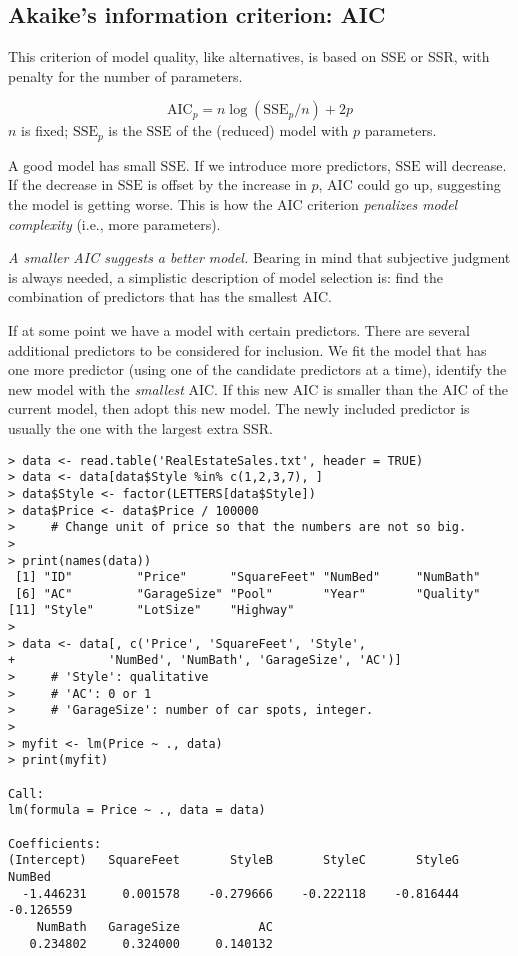 \documentclass[12pt]{article}
\newcommand\SSE{\text{SSE}}
\begin{document}
\subsection*{Akaike's information criterion: AIC}

This criterion of model quality, like alternatives,
is based on SSE or SSR, with penalty for the number of
parameters.

\[
\text{AIC}_p = n \log (\SSE_p / n) + 2p
\]
$n$ is fixed;
$\SSE_p$ is the $\SSE$ of the (reduced) model with
$p$ parameters.

A good model has small $\SSE$.
If we introduce more predictors, $\SSE$ will decrease.
If the decrease in $\SSE$ is offset by the increase in $p$,
AIC could go up, suggesting the model is getting worse.
This is how the AIC criterion \emph{penalizes model complexity} (i.e.,
more parameters).

\emph{A smaller AIC suggests a better model.}
Bearing in mind that subjective judgment is always needed,
a simplistic description of model selection is:
find the combination of predictors that has the smallest AIC.

If at some point we have a model with certain predictors.
There are several additional predictors to be considered for inclusion.
We fit the model that has one more predictor (using one of the candidate
predictors at a time), identify the new model with the \emph{smallest} AIC.
If this new AIC is smaller than the AIC of the current model,
then adopt this new model.
The newly included predictor is usually the one with the largest extra
SSR.


\begin{verbatim}
> data <- read.table('RealEstateSales.txt', header = TRUE)
> data <- data[data$Style %in% c(1,2,3,7), ]
> data$Style <- factor(LETTERS[data$Style])
> data$Price <- data$Price / 100000
>     # Change unit of price so that the numbers are not so big.
> 
> print(names(data))
 [1] "ID"         "Price"      "SquareFeet" "NumBed"     "NumBath"   
 [6] "AC"         "GarageSize" "Pool"       "Year"       "Quality"   
[11] "Style"      "LotSize"    "Highway"   
> 
> data <- data[, c('Price', 'SquareFeet', 'Style',
+             'NumBed', 'NumBath', 'GarageSize', 'AC')]
>     # 'Style': qualitative
>     # 'AC': 0 or 1
>     # 'GarageSize': number of car spots, integer.
> 
> myfit <- lm(Price ~ ., data)
> print(myfit)

Call:
lm(formula = Price ~ ., data = data)

Coefficients:
(Intercept)   SquareFeet       StyleB       StyleC       StyleG       NumBed  
  -1.446231     0.001578    -0.279666    -0.222118    -0.816444    -0.126559  
    NumBath   GarageSize           AC  
   0.234802     0.324000     0.140132  
\end{verbatim}
\end{document}
